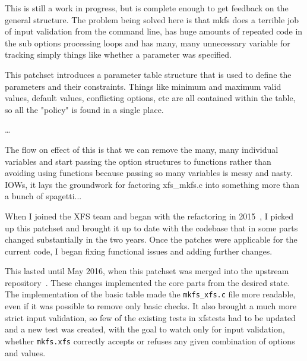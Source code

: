\begin{displayquote}
This is still a work in progress, but is complete enough to get
feedback on the general structure. The problem being solved here is
that mkfs does a terrible job of input validation from the command
line, has huge amounts of repeated code in the sub options
processing loops and has many, many unnecessary variable for
tracking simply things like whether a parameter was specified.

This patchset introduces a parameter table structure that is used to
define the parameters and their constraints. Things like minimum and
maximum valid values, default values, conflicting options, etc are
all contained within the table, so all the "policy" is found in a
single place.

\ldots

The flow on effect of this is that we can remove the many, many
individual variables and start passing the option structures to
functions rather than avoiding using functions because passing so
many variables is messy and nasty. IOWs, it lays the groundwork for
factoring xfs\_mkfs.c into something more than a bunch of spagetti...
\end{displayquote}

When I joined the XFS team and began with the refactoring in
2015~\cite{myFirstPatches}, I picked up this patchset and brought it up to
date with the codebase that in some parts changed substantially in the two
years. Once the patches were applicable for the current code, I began
fixing functional issues and adding further changes.


This lasted until May 2016, when this patchset was merged into the upstream
repository~\cite{finalPatchset1,finalPatchset1Announce}.
These changes implemented the core parts from the desired state. The
implementation of the basic table made the {\tt mkfs\_xfs.c} file more
readable, even if it was possible to remove only basic checks. It also
brought a much more strict input validation, so few of the existing tests
in xfstests had to be updated and a new test was created, with the goal to
watch only for input validation, whether {\tt mkfs.xfs} correctly accepts
or refuses any given combination of options and values.

